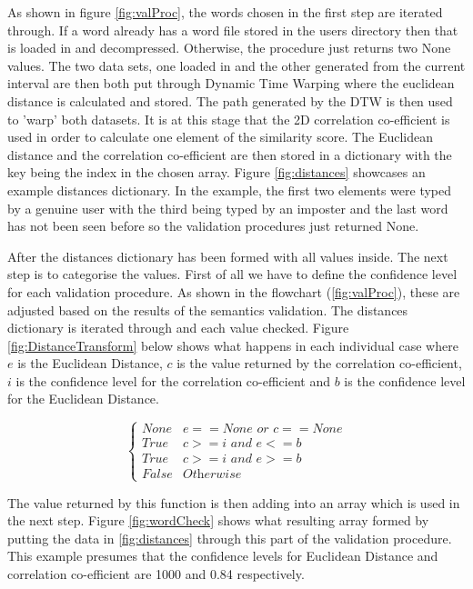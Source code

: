 \documentclass[10pt,a4paper]{report}
\begin{document}
As shown in figure \ref{fig:valProc}, the words chosen in the first step are iterated through. If a word already has a word file stored in the users directory then that is loaded in and decompressed. Otherwise, the procedure just returns two None values. The two data sets, one loaded in and the other generated from the current interval are then both put through Dynamic Time Warping where the euclidean distance is calculated and stored. The path generated by the DTW is then used to 'warp' both datasets. It is at this stage that the 2D correlation co-efficient is used in order to calculate one element of the similarity score. The Euclidean distance and the correlation co-efficient are then stored in a dictionary with the key being the index in the chosen array. Figure \ref{fig:distances} showcases an example distances dictionary. In the example, the first two elements were typed by a genuine user with the third being typed by an imposter and the last word has not been seen before so the validation procedures just returned None.

After the distances dictionary has been formed with all values inside. The next step is to categorise the values. First of all we have to define the confidence level for each validation procedure. As shown in the flowchart (\ref{fig:valProc}), these are adjusted based on the results of the semantics validation. The distances dictionary is iterated through and each value checked. Figure \ref{fig:DistanceTransform} below shows what happens in each individual case where \(e\) is the Euclidean Distance, \(c\) is the value returned by the correlation co-efficient, \(i\) is the confidence level for the correlation co-efficient and \(b\) is the confidence level for the Euclidean Distance.

\begin{equation}
	\begin{cases}
		\textit{None} & e == \textit{None or } c == \textit{None} \\
		\textit{True} & c >= i \textit{ and } e <= b \\
		\textit{True} & c >= i \textit{ and } e >= b \\
		\textit{False} & \textit{Otherwise}
	\end{cases}
	\label{fig:DistanceTransform}
\end{equation}

The value returned by this function is then adding into an array which is used in the next step. Figure \ref{fig:wordCheck} shows what resulting array formed by putting the data in \ref{fig:distances} through this part of the validation procedure. This example presumes that the confidence levels for Euclidean Distance and correlation co-efficient are 1000 and 0.84 respectively.
\end{document}
